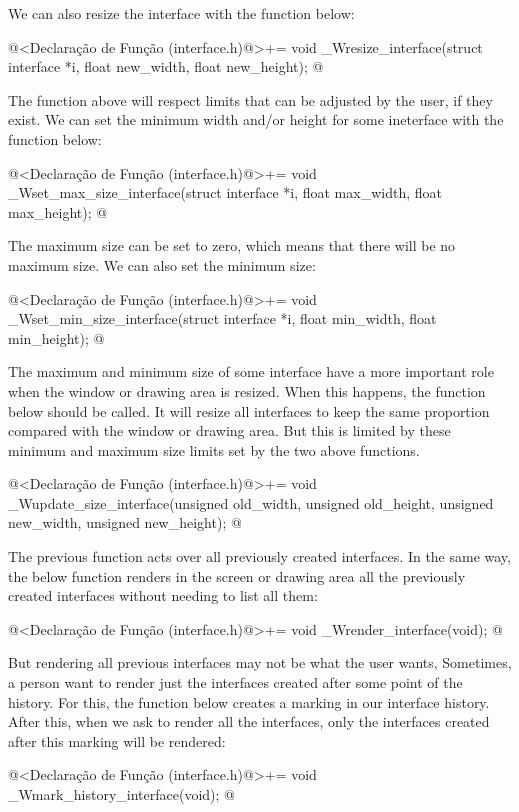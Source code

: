 We can also resize the interface with the function below:

\iniciocodigo
@<Declaração de Função (interface.h)@>+=
void _Wresize_interface(struct interface *i, float new_width, float new_height);
@
\fimcodigo

The function above will respect limits that can be adjusted by the
user, if they exist. We can set the minimum width and/or height for
some ineterface with the function below:

\iniciocodigo
@<Declaração de Função (interface.h)@>+=
void _Wset_max_size_interface(struct interface *i, float max_width,
                              float max_height);
@
\fimcodigo

The maximum size can be set to zero, which means that there will be no
maximum size. We can also set the minimum size:

\iniciocodigo
@<Declaração de Função (interface.h)@>+=
void _Wset_min_size_interface(struct interface *i, float min_width,
                              float min_height);
@
\fimcodigo

The maximum and minimum size of some interface have a more important
role when the window or drawing area is resized. When this happens,
the function below should be called. It will resize all interfaces to
keep the same proportion compared with the window or drawing area. But
this is limited by these minimum and maximum size limits set by the
two above functions.

\iniciocodigo
@<Declaração de Função (interface.h)@>+=
void _Wupdate_size_interface(unsigned old_width, unsigned old_height,
                             unsigned new_width, unsigned new_height);
@
\fimcodigo

The previous function acts over all previously created interfaces. In
the same way, the below function renders in the screen or drawing area
all the previously created interfaces without needing to list all
them:

\iniciocodigo
@<Declaração de Função (interface.h)@>+=
void _Wrender_interface(void);
@
\fimcodigo

But rendering all previous interfaces may not be what the user wants,
Sometimes, a person want to render just the interfaces created after
some point of the history. For this, the function below creates a
marking in our interface history. After this, when we ask to render
all the interfaces, only the interfaces created after this marking
will be rendered:

\iniciocodigo
@<Declaração de Função (interface.h)@>+=
void _Wmark_history_interface(void);
@
\fimcodigo

